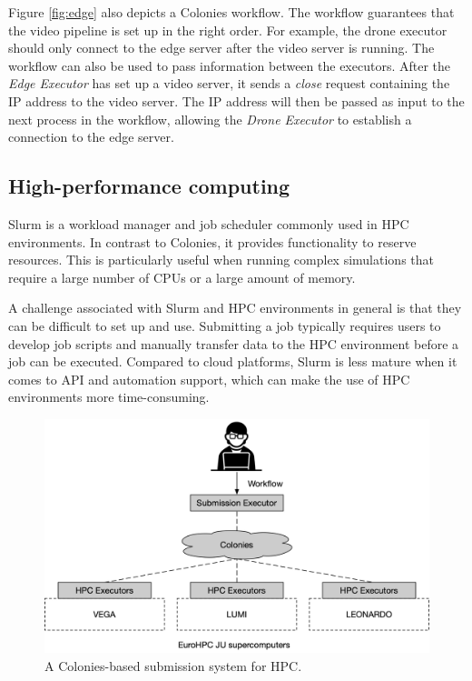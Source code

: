 \documentclass{article}
\begin{document}
Figure \ref{fig:edge} also depicts a Colonies workflow. The workflow guarantees that the video pipeline is set up in the right order. For example, the drone executor should only connect to the edge server after the video server is running. The workflow can also be used to pass information between the executors. After the \emph{Edge Executor} has set up a video server, it sends a \emph{close} request containing the IP address to the video server. The IP address will then be passed as input to the next process in the workflow, allowing the \emph{Drone Executor} to establish a connection to the edge server.

\subsection{High-performance computing}
\label{hpc_use_case}
Slurm \cite{slurm} is a workload manager and job scheduler commonly used in HPC environments. In contrast to Colonies, it provides functionality to reserve resources. This is particularly useful when running complex simulations that require a large number of CPUs or a large amount of memory. 

A challenge associated with Slurm and HPC environments in general is that they can be difficult to set up and use. Submitting a job typically requires users to develop job scripts and manually transfer data to the HPC environment before a job can be executed. Compared to cloud platforms, Slurm is less mature when it comes to API and automation support, which can make the use of HPC environments more time-consuming.

\begin{figure}[h]
	\centering
    \includegraphics[scale=0.43]{hpc_overlay.png}
	\caption{A Colonies-based submission system for HPC.}
	\label{fig:hpc_overlay}
\end{figure}
\end{document}
